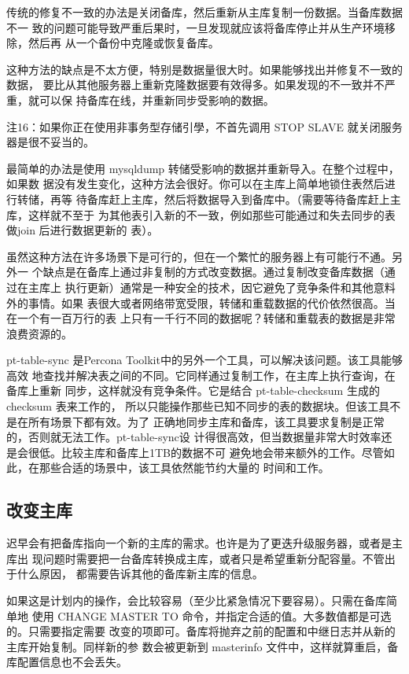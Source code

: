 传统的修复不一致的办法是关闭备库，然后重新从主库复制一份数据。当备库数据不一
致的问题可能导致严重后果时，一旦发现就应该将备库停止并从生产环境移除，然后再
从一个备份中克隆或恢复备库。

这种方法的缺点是不太方便，特别是数据量很大时。如果能够找出并修复不一致的数据，
要比从其他服务器上重新克隆数据要有效得多。如果发现的不一致并不严重，就可以保
持备库在线，并重新同步受影响的数据。

注16：如果你正在使用非事务型存储引學，不首先调用 STOP SLAVE 就关闭服务器是很不妥当的。

最简单的办法是使用 mysqldump 转储受影响的数据并重新导入。在整个过程中，如果数
据没有发生变化，这种方法会很好。你可以在主库上简单地锁住表然后进行转储，再等
待备库赶上主库，然后将数据导入到备库中。（需要等待备库赶上主库，这样就不至于
为其他表引入新的不一致，例如那些可能通过和失去同步的表做join 后进行数据更新的
表）。

虽然这种方法在许多场景下是可行的，但在一个繁忙的服务器上有可能行不通。另外一
个缺点是在备库上通过非复制的方式改变数据。通过复制改变备库数据（通过在主库上
执行更新）通常是一种安全的技术，因它避免了竞争条件和其他意料外的事情。如果
表很大或者网络带宽受限，转储和重载数据的代价依然很高。当在一个有一百万行的表
上只有一千行不同的数据呢？转储和重载表的数据是非常浪费资源的。

pt-table-sync 是Percona Toolkit中的另外一个工具，可以解决该问题。该工具能够高效
地查找并解决表之间的不同。它同样通过复制工作，在主库上执行查询，在备库上重新
同步，这样就没有竞争条件。它是结合 pt-table-checksum 生成的 checksum 表来工作的，
所以只能操作那些已知不同步的表的数据块。但该工具不是在所有场景下都有效。为了
正确地同步主库和备库，该工具要求复制是正常的，否则就无法工作。pt-table-sync设
计得很高效，但当数据量非常大时效率还是会很低。比较主库和备库上1TB的数据不可
避免地会带来额外的工作。尽管如此，在那些合适的场景中，该工具依然能节约大量的
时间和工作。

\subsection{改变主库}
迟早会有把备库指向一个新的主库的需求。也许是为了更迭升级服务器，或者是主库出
现问题时需要把一台备库转换成主库，或者只是希望重新分配容量。不管出于什么原因，
都需要告诉其他的备库新主库的信息。

如果这是计划内的操作，会比较容易（至少比紧急情况下要容易）。只需在备库简单地
使用 CHANGE MASTER TO 命令，并指定合适的值。大多数值都是可选的。只需要指定需要
改变的项即可。备库将抛弃之前的配置和中继日志并从新的主库开始复制。同样新的参
数会被更新到 masterinfo 文件中，这样就算重启，备库配置信息也不会丢失。

